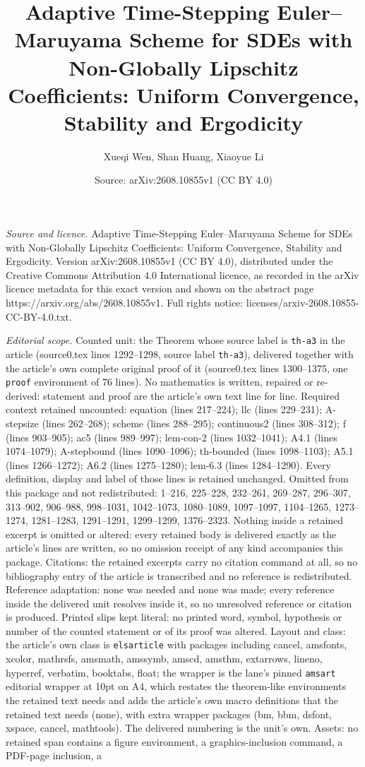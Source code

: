 \documentclass[10pt,a4paper]{amsart}
\title[Adaptive Time-Stepping Euler--Maruyama Scheme for SDEs with ]{Adaptive Time-Stepping Euler--Maruyama Scheme for SDEs with Non-Globally Lipschitz Coefficients: Uniform Convergence, Stability and Ergodicity}
\author{Xueqi Wen, Shan Huang, Xiaoyue Li}
\date{Source: arXiv:2608.10855v1 (CC BY 4.0)}
\begin{document}
\maketitle

\noindent\emph{Source and licence.} Adaptive Time-Stepping Euler--Maruyama Scheme for SDEs with Non-Globally Lipschitz Coefficients: Uniform Convergence, Stability and Ergodicity. Version arXiv:2608.10855v1 (CC BY 4.0), distributed under the Creative Commons Attribution 4.0 International licence, as recorded in the arXiv licence metadata for this exact version and shown on the abstract page https://arxiv.org/abs/2608.10855v1. Full rights notice: licenses/arxiv-2608.10855-CC-BY-4.0.txt.\par\smallskip

\noindent\textit{Editorial scope.} Counted unit: the Theorem whose source label is \texttt{th-a3} in the article (source0.tex lines 1292--1298, source label \texttt{th-a3}), delivered together with the article's own complete original proof of it (source0.tex lines 1300--1375, one \texttt{proof} environment of 76 lines). No mathematics is written, repaired or re-derived: statement and proof are the article's own text line for line. Required context retained uncounted: equation (lines 217--224); llc (lines 229--231); A-stepsize (lines 262--268); scheme (lines 288--295); continuous2 (lines 308--312); f (lines 903--905); ac5 (lines 989--997); lem-con-2 (lines 1032--1041); A4.1 (lines 1074--1079); A-stepbound (lines 1090--1096); th-bounded (lines 1098--1103); A5.1 (lines 1266--1272); A6.2 (lines 1275--1280); lem-6.3 (lines 1284--1290). Every definition, display and label of those lines is retained unchanged. Omitted from this package and not redistributed: 1--216, 225--228, 232--261, 269--287, 296--307, 313--902, 906--988, 998--1031, 1042--1073, 1080--1089, 1097--1097, 1104--1265, 1273--1274, 1281--1283, 1291--1291, 1299--1299, 1376--2323. Nothing inside a retained excerpt is omitted or altered: every retained body is delivered exactly as the article's lines are written, so no omission receipt of any kind accompanies this package. Citations: the retained excerpts carry no citation command at all, so no bibliography entry of the article is transcribed and no reference is redistributed. Reference adaptation: none was needed and none was made; every reference inside the delivered unit resolves inside it, so no unresolved reference or citation is produced. Printed slips kept literal: no printed word, symbol, hypothesis or number of the counted statement or of its proof was altered. Layout and class: the article's own class is \texttt{elsarticle} with packages including cancel, amsfonts, xcolor, mathrsfs, amsmath, amssymb, amscd, amsthm, extarrows, lineno, hyperref, verbatim, booktabs, float; the wrapper is the lane's pinned \texttt{amsart} editorial wrapper at 10pt on A4, which restates the theorem-like environments the retained text needs and adds the article's own macro definitions that the retained text needs (none), with extra wrapper packages (bm, bbm, dsfont, xspace, cancel, mathtools). The delivered numbering is the unit's own. Assets: no retained span contains a figure environment, a graphics-inclusion command, a PDF-page inclusion, a 
\end{document}
